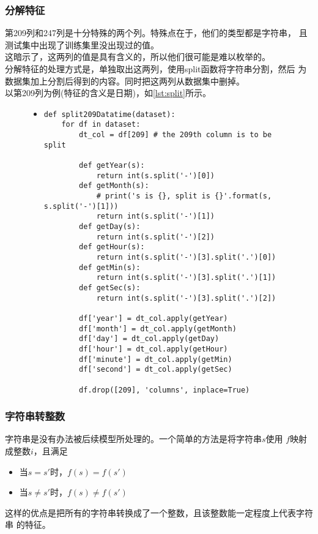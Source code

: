 \documentclass[a4paper]{article}
\begin{document}
\subsubsection{分解特征}\label{subsec:split}
第209列和247列是十分特殊的两个列。特殊点在于，他们的类型都是字符串，
且测试集中出现了训练集里没出现过的值。\\

这暗示了，这两列的值是具有含义的，所以他们很可能是难以枚举的。\\

分解特征的处理方式是，单独取出这两列，使用split函数将字符串分割，然后
为数据集加上分割后得到的内容。同时把这两列从数据集中删掉。\\

以第209列为例(特征的含义是日期)，如\autoref{lst:split}所示。

\begin{figure}[!hbt]
\begin{itemize}
\item[] \begin{lstlisting}[style=mypython, label=lst:split, caption=对209列的特征工程处理]
def split209Datatime(dataset):
    for df in dataset:
        dt_col = df[209] # the 209th column is to be split

        def getYear(s):
            return int(s.split('-')[0])
        def getMonth(s):
            # print('s is {}, split is {}'.format(s, s.split('-')[1]))
            return int(s.split('-')[1])
        def getDay(s):
            return int(s.split('-')[2])
        def getHour(s):
            return int(s.split('-')[3].split('.')[0])
        def getMin(s):
            return int(s.split('-')[3].split('.')[1])
        def getSec(s):
            return int(s.split('-')[3].split('.')[2])
        
        df['year'] = dt_col.apply(getYear)
        df['month'] = dt_col.apply(getMonth)
        df['day'] = dt_col.apply(getDay)
        df['hour'] = dt_col.apply(getHour)
        df['minute'] = dt_col.apply(getMin)
        df['second'] = dt_col.apply(getSec)

        df.drop([209], 'columns', inplace=True)
\end{lstlisting}
\end{itemize}
\end{figure}

\subsubsection{字符串转整数}\label{subsec:toint}
字符串是没有办法被后续模型所处理的。一个简单的方法是将字符串$s$使用
$f$映射成整数$i$，且满足
\begin{itemize}
    \item 当$s = s'$时，$f(s) = f(s')$
    \item 当$s \ne s'$时，$f(s) \ne f(s')$
\end{itemize}
这样的优点是把所有的字符串转换成了一个整数，且该整数能一定程度上代表字符串
的特征。\\
\end{document}
